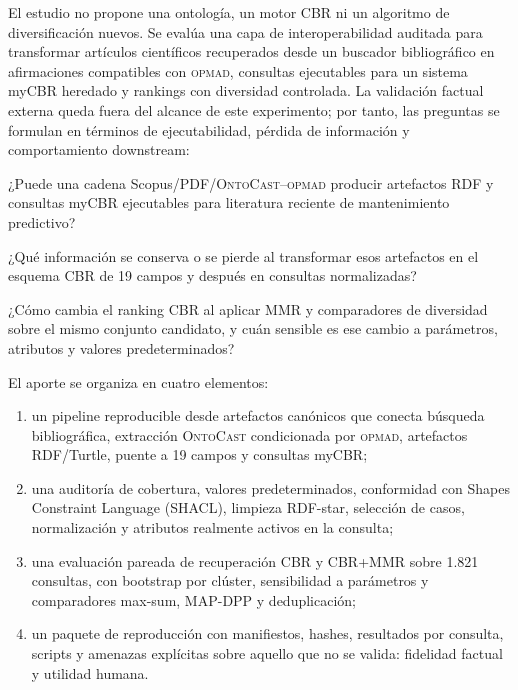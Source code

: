 \documentclass[11pt,a4paper]{article}
\newcommand{\OPMAD}{\textsc{opmad}}
\newcommand{\OntoCast}{\textsc{OntoCast}}
\newcommand{\myCBR}{myCBR}
\begin{document}
El estudio no propone una ontología, un motor CBR ni un algoritmo de diversificación nuevos. Se evalúa una capa de interoperabilidad auditada para transformar artículos científicos recuperados desde un buscador bibliográfico en afirmaciones compatibles con \OPMAD{}, consultas ejecutables para un sistema \myCBR{} heredado y rankings con diversidad controlada. La validación factual externa queda fuera del alcance de este experimento; por tanto, las preguntas se formulan en términos de ejecutabilidad, pérdida de información y comportamiento downstream:

\begin{description}[style=nextline,leftmargin=1.5cm,labelwidth=1.2cm]
  \item[P1.] ¿Puede una cadena Scopus/PDF/\OntoCast{}--\OPMAD{} producir artefactos RDF y consultas \myCBR{} ejecutables para literatura reciente de mantenimiento predictivo?
  \item[P2.] ¿Qué información se conserva o se pierde al transformar esos artefactos en el esquema CBR de 19 campos y después en consultas normalizadas?
  \item[P3.] ¿Cómo cambia el ranking CBR al aplicar MMR y comparadores de diversidad sobre el mismo conjunto candidato, y cuán sensible es ese cambio a parámetros, atributos y valores predeterminados?
\end{description}

El aporte se organiza en cuatro elementos:

\begin{enumerate}[label=(\roman*)]
  \item un pipeline reproducible desde artefactos canónicos que conecta búsqueda bibliográfica, extracción \OntoCast{} condicionada por \OPMAD{}, artefactos RDF/Turtle, puente a 19 campos y consultas \myCBR{};
  \item una auditoría de cobertura, valores predeterminados, conformidad con Shapes Constraint Language (SHACL), limpieza RDF-star, selección de casos, normalización y atributos realmente activos en la consulta;
  \item una evaluación pareada de recuperación CBR y CBR+MMR sobre 1.821 consultas, con bootstrap por clúster, sensibilidad a parámetros y comparadores max-sum, MAP-DPP y deduplicación;
  \item un paquete de reproducción con manifiestos, hashes, resultados por consulta, scripts y amenazas explícitas sobre aquello que no se valida: fidelidad factual y utilidad humana.
\end{enumerate}
\end{document}
